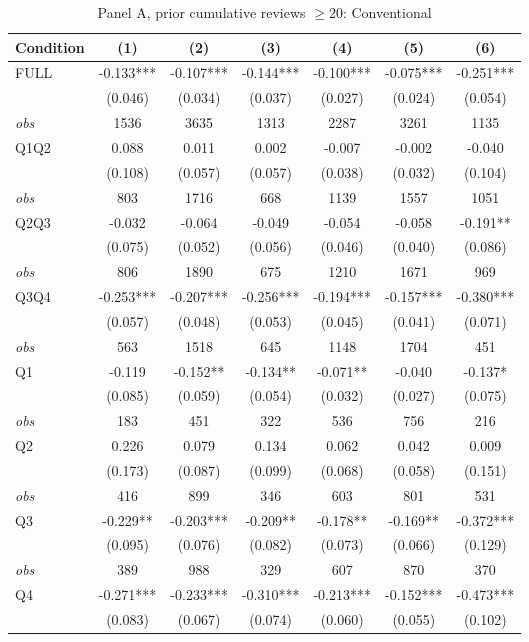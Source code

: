 \begin{table}[!htbp]
\centering
\caption{Panel A, prior cumulative reviews $\geq20$: Conventional}
\begin{tabular}{lcccccc}
\toprule
Condition & (1) & (2) & (3) & (4) & (5) & (6) \\
\midrule
FULL & -0.133*** & -0.107*** & -0.144*** & -0.100*** & -0.075*** & -0.251*** \\
 & (0.046) & (0.034) & (0.037) & (0.027) & (0.024) & (0.054) \\
\textit{obs} & 1536 & 3635 & 1313 & 2287 & 3261 & 1135 \\
Q1Q2 & 0.088 & 0.011 & 0.002 & -0.007 & -0.002 & -0.040 \\
 & (0.108) & (0.057) & (0.057) & (0.038) & (0.032) & (0.104) \\
\textit{obs} & 803 & 1716 & 668 & 1139 & 1557 & 1051 \\
Q2Q3 & -0.032 & -0.064 & -0.049 & -0.054 & -0.058 & -0.191** \\
 & (0.075) & (0.052) & (0.056) & (0.046) & (0.040) & (0.086) \\
\textit{obs} & 806 & 1890 & 675 & 1210 & 1671 & 969 \\
Q3Q4 & -0.253*** & -0.207*** & -0.256*** & -0.194*** & -0.157*** & -0.380*** \\
 & (0.057) & (0.048) & (0.053) & (0.045) & (0.041) & (0.071) \\
\textit{obs} & 563 & 1518 & 645 & 1148 & 1704 & 451 \\
Q1 & -0.119 & -0.152** & -0.134** & -0.071** & -0.040 & -0.137* \\
 & (0.085) & (0.059) & (0.054) & (0.032) & (0.027) & (0.075) \\
\textit{obs} & 183 & 451 & 322 & 536 & 756 & 216 \\
Q2 & 0.226 & 0.079 & 0.134 & 0.062 & 0.042 & 0.009 \\
 & (0.173) & (0.087) & (0.099) & (0.068) & (0.058) & (0.151) \\
\textit{obs} & 416 & 899 & 346 & 603 & 801 & 531 \\
Q3 & -0.229** & -0.203*** & -0.209** & -0.178** & -0.169** & -0.372*** \\
 & (0.095) & (0.076) & (0.082) & (0.073) & (0.066) & (0.129) \\
\textit{obs} & 389 & 988 & 329 & 607 & 870 & 370 \\
Q4 & -0.271*** & -0.233*** & -0.310*** & -0.213*** & -0.152*** & -0.473*** \\
 & (0.083) & (0.067) & (0.074) & (0.060) & (0.055) & (0.102) \\

\end{tabular}
\end{table}
